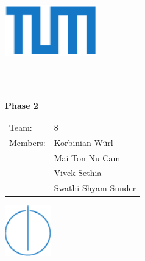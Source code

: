 \begin{titlepage}
  \centering

  \includegraphics[width=40mm]{logos/tum}

  \vspace{5mm}
  {\huge\MakeUppercase{\getFaculty{}}}\\

  \vspace{5mm}
  {\large\MakeUppercase{\getUniversity{}}}\\

  \vspace{15mm}
  {\huge\bfseries \getTitle{}}

  \vspace{10mm}
  {\huge\bfseries Phase 2}

  \vspace{15mm}
  \begin{tabular}{l l}
    Team: & 8 \\
    Members:  & Korbinian Würl \\
              & Mai Ton Nu Cam \\
              & Vivek Sethia \\
              & Swathi Shyam Sunder
  \end{tabular}

  \vspace{20mm}
  \includegraphics[width=20mm]{logos/faculty}
\end{titlepage}
